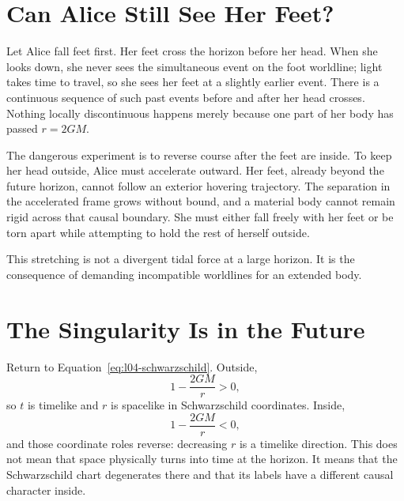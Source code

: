 \section{Can Alice Still See Her Feet?}

Let Alice fall feet first. Her feet cross the horizon before her head. When she looks down, she never sees the simultaneous event on the foot worldline; light takes time to travel, so she sees her feet at a slightly earlier event. There is a continuous sequence of such past events before and after her head crosses. Nothing locally discontinuous happens merely because one part of her body has passed \(r=2GM\).

The dangerous experiment is to reverse course after the feet are inside. To keep her head outside, Alice must accelerate outward. Her feet, already beyond the future horizon, cannot follow an exterior hovering trajectory. The separation in the accelerated frame grows without bound, and a material body cannot remain rigid across that causal boundary. She must either fall freely with her feet or be torn apart while attempting to hold the rest of herself outside.

This stretching is not a divergent tidal force at a large horizon. It is the consequence of demanding incompatible worldlines for an extended body.

\section{The Singularity Is in the Future}

Return to Equation~\eqref{eq:l04-schwarzschild}. Outside,
\begin{equation}
1-\frac{2GM}{r}>0,
\end{equation}
so \(t\) is timelike and \(r\) is spacelike in Schwarzschild coordinates. Inside,
\begin{equation}
1-\frac{2GM}{r}<0,
\end{equation}
and those coordinate roles reverse: decreasing \(r\) is a timelike direction. This does not mean that space physically turns into time at the horizon. It means that the Schwarzschild chart degenerates there and that its labels have a different causal character inside.


